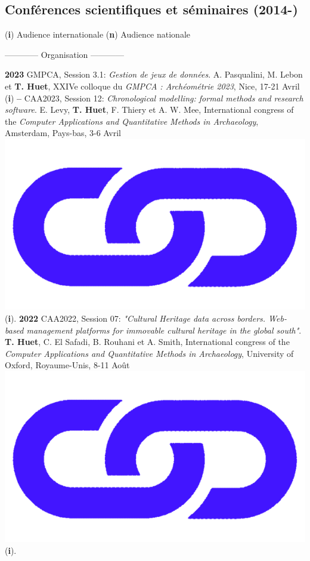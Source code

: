 \documentclass{article}
\begin{document}
\subsection*{Conférences scientifiques et séminaires (2014-)}

\begin{center}(\textbf{i}) Audience internationale {\textbar} (\textbf{n}) Audience nationale\end{center}
\smallbreak
\begin{center}------------ Organisation ------------\end{center}
\textbf{2023 }GMPCA, Session 3.1: \textit{Gestion de jeux de données}. A. Pasqualini, M. Lebon et \textbf{T. Huet}, XXIVe colloque du \textit{GMPCA : Archéométrie 2023}, Nice, 17-21 Avril (\textbf{i})
\smallbreak
\textbf{-- }CAA2023, Session 12: \textit{Chronological modelling: formal methods and research software}. E. Levy, \textbf{T. Huet}, F. Thiery et A. W. Mee, International congress of the \textit{Computer Applications and Quantitative Methods in Archaeology}, Amsterdam, Pays-bas, 3-6 Avril \href{https://historical-time.github.io/caa23/s12/pres/#/title-slide}{\includegraphics[scale=0.02]{link_darkblue.png}} (\textbf{i}).
\smallbreak
\textbf{2022 }CAA2022, Session 07: \textit{"Cultural Heritage data across borders. Web-based management platforms for immovable cultural heritage in the global south"}. \textbf{T. Huet}, C. El Safadi, B. Rouhani et A. Smith, International congress of the \textit{Computer Applications and Quantitative Methods in Archaeology}, University of Oxford, Royaume-Unis, 8-11 Août \href{https://eamena-project.github.io/reveal.js/projects/caa22s07.html}{\includegraphics[scale=0.02]{link_darkblue.png}} (\textbf{i}). 
\end{document}
